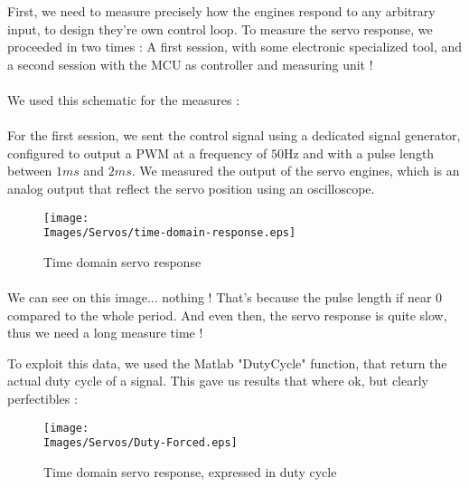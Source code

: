 First, we need to measure precisely how the engines respond to any arbitrary input, to design they're own control loop.
To measure the servo response, we proceeded in two times : A first session, with some electronic specialized tool, 
and a second session with the MCU as controller and measuring unit !

\paragraph{}
We used this schematic for the measures :


\paragraph{}
For the first session, we sent the control signal using a dedicated signal generator, configured 
to output a PWM at a frequency of $50 \si{\hertz}$ and with a pulse length between $1 \si{ms}$ and
$2 \si{ms}$.
We measured the output of the servo engines, which is an analog output that reflect the servo position
using an oscilloscope.

\begin{figure}[!hbt]
    \centering
    \texttt{[image: \\Images/Servos/time-domain-response.eps]}
    \caption{Time domain servo response}
\end{figure}
\FloatBarrier

\paragraph{}
We can see on this image... nothing ! That's because the pulse length if near 0 compared to the whole
period. And even then, the servo response is quite slow, thus we need a long measure time !

To exploit this data, we used the Matlab "DutyCycle" function, that return the actual duty cycle of a signal.
This gave us results that where ok, but clearly perfectibles :

\begin{figure}[!hbt]
    \centering
    \texttt{[image: \\Images/Servos/Duty-Forced.eps]}
    \caption{Time domain servo response, expressed in duty cycle}
\end{figure}
\FloatBarrier


